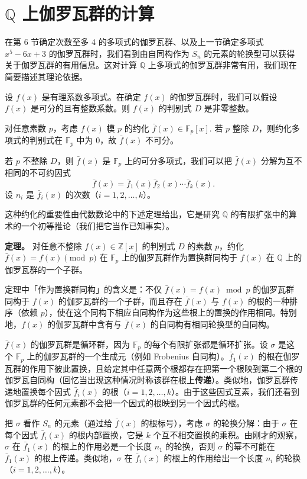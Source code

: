 \section{\(\mathbb{Q}\) 上伽罗瓦群的计算}

在第 6 节确定次数至多 4 的多项式的伽罗瓦群、以及上一节确定多项式 \(x^5-6x+3\) 的伽罗瓦群时，我们看到由自同构作为 \(S_n\) 的元素的轮换型可以获得关于伽罗瓦群的有用信息。这对计算 \(\mathbb{Q}\) 上多项式的伽罗瓦群非常有用，我们现在简要描述其理论依据。

设 \(f(x)\) 是有理系数多项式。在确定 \(f(x)\) 的伽罗瓦群时，我们可以假设 \(f(x)\) 是可分的且有整数系数。则 \(f(x)\) 的判别式 \(D\) 是非零整数。

对任意素数 \(p\)，考虑 \(f(x)\) 模 \(p\) 的约化 \(\bar f(x) \in \mathbb{F}_p[x]\). 若 \(p\) 整除 \(D\)，则约化多项式的判别式在 \(\mathbb{F}_p\) 中为 \(0\)，故 \(\bar f(x)\) 不可分。

若 \(p\) 不整除 \(D\)，则 \(\bar f(x)\) 是 \(\mathbb{F}_p\) 上的可分多项式，我们可以把 \(\bar f(x)\) 分解为互不相同的不可约因式
\[
\bar f(x) = \bar f_1(x)\bar f_2(x)\cdots\bar f_k(x).
\]
设 \(n_i\) 是 \(\bar f_i(x)\) 的次数（\(i = 1, 2, \ldots, k\)）。

这种约化的重要性由代数数论中的下述定理给出，它是研究 \(\mathbb{Q}\) 的有限扩张中的算术的一个初等推论（我们把它当作已知事实）。

\noindent\textbf{定理。} 对任意不整除 \(f(x) \in \mathbb{Z}[x]\) 的判别式 \(D\) 的素数 \(p\)，约化 \(\bar f(x) = f(x) \pmod p\) 在 \(\mathbb{F}_p\) 上的伽罗瓦群作为置换群同构于 \(f(x)\) 在 \(\mathbb{Q}\) 上的伽罗瓦群的一个子群。

定理中「作为置换群同构」的含义是：不仅 \(\bar f(x) = f(x) \bmod p\) 的伽罗瓦群同构于 \(f(x)\) 的伽罗瓦群的一个子群，而且存在 \(\bar f(x)\) 与 \(f(x)\) 的根的一种排序（依赖 \(p\)），使在这个同构下相应自同构作为这些根上的置换的作用相同。特别地，\(f(x)\) 的伽罗瓦群中含有与 \(\bar f(x)\) 的自同构有相同轮换型的自同构。

\(\bar f(x)\) 的伽罗瓦群是循环群，因为 \(\mathbb{F}_p\) 的每个有限扩张都是循环扩张。设 \(\sigma\) 是这个 \(\mathbb{F}_p\) 上的伽罗瓦群的一个生成元（例如 Frobenius 自同构）。\(\bar f_1(x)\) 的根在伽罗瓦群的作用下彼此置换，且给定其中任意两个根都存在把第一个根映到第二个根的伽罗瓦自同构（回忆当出现这种情况时称该群在根上\textbf{传递}）。类似地，伽罗瓦群传递地置换每个因式 \(\bar f_i(x)\) 的根（\(i = 1, 2, \ldots, k\)）。由于这些因式互素，我们还看到伽罗瓦群的任何元素都不会把一个因式的根映到另一个因式的根。

把 \(\sigma\) 看作 \(S_n\) 的元素（通过给 \(\bar f(x)\) 的根标号），考虑 \(\sigma\) 的轮换分解：由于 \(\sigma\) 在每个因式 \(\bar f_i(x)\) 的根内部置换，它是 \(k\) 个互不相交置换的乘积。由刚才的观察，\(\sigma\) 在 \(\bar f_1(x)\) 的根上的作用必是一个长度 \(n_1\) 的轮换，否则 \(\sigma\) 的幂不可能在 \(\bar f_1(x)\) 的根上传递。类似地，\(\sigma\) 在 \(\bar f_i(x)\) 的根上的作用给出一个长度 \(n_i\) 的轮换（\(i = 1, 2, \ldots, k\)）。

